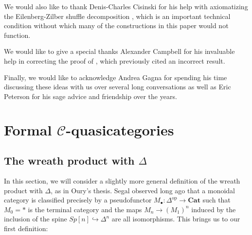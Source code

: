 \documentclass[leqno]{article}
\numberwithin{equation}{subsection}
\theoremstyle{plain}   %
\theoremstyle{remark}
\theoremstyle{plain}
\newcommand{\op}{\ensuremath{\mathrm{op}}}
\newcommand{\Cat}{\ensuremath{\mathbf{Cat}}}
\providecommand{\C}{}
\renewcommand{\C}{\ensuremath{\mathcal{C}}}
\begin{document}
We would also like to thank Denis-Charles Cisinski for his help with axiomatizing the Eilenberg-Zilber shuffle decomposition , which is an important technical condition without which many of the constructions in this paper would not function.  

We would like to give a special thanks Alexander Campbell for his invaluable help in correcting the proof of , which previously cited an incorrect result.

Finally, we would like to acknowledge Andrea Gagna for spending his time discussing these ideas with us over several long conversations as well as Eric Peterson for his sage advice and friendship over the years.  


\section{Formal \(\C\)-quasicategories}
\subsection{The wreath product with \(\Delta\)}
In this section, we will consider a slightly more general definition of the wreath product with \(\Delta\), as in Oury's thesis. Segal observed long ago that a monoidal category is classified precisely by a pseudofunctor \(M_\bullet:\Delta^\op\to \Cat\) such that \(M_0=\ast\) is the terminal category and the maps \(M_n \to {(M_1)}^n\) induced by the inclusion of the spine \(Sp[n]\hookrightarrow \Delta^n\) are all isomorphisms.  This brings us to our first definition:
\end{document}
